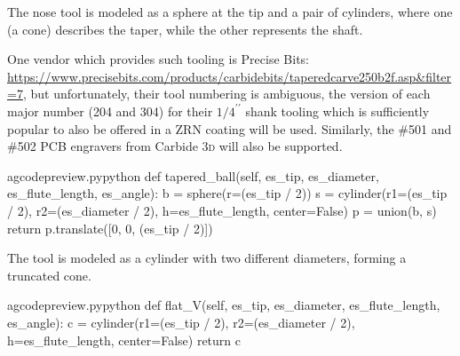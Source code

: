 \documentclass{ltxdoc}
\begin{document}
The  nose tool is modeled as a sphere at the tip and a pair of cylinders, where one (a cone) describes the taper, while the other represents the shaft.

One vendor which provides such tooling is Precise Bits: \url{https://www.precisebits.com/products/carbidebits/taperedcarve250b2f.asp&filter=7}, but unfortunately, their tool numbering is ambiguous, the version of each major number (204 and 304) for their $1/4^{\prime\prime}$ shank tooling which is sufficiently popular to also be offered in a ZRN coating will be used. Similarly, the \#501 and \#502 PCB engravers from Carbide \textsc{3d} will also be supported.

\lstset{firstnumber=\thegcpy}
\begin{writecode}{a}{gcodepreview.py}{python}
    def tapered_ball(self, es_tip, es_diameter, es_flute_length, es_angle):
        b = sphere(r=(es_tip / 2))
        s = cylinder(r1=(es_tip / 2), r2=(es_diameter / 2), h=es_flute_length, center=False)
        p = union(b, s)
        return p.translate([0, 0, (es_tip / 2)])

\end{writecode}
\addtocounter{gcpy}{6}

The  tool is modeled as a cylinder with two different diameters, forming a truncated cone.

\lstset{firstnumber=\thegcpy}
\begin{writecode}{a}{gcodepreview.py}{python}
    def flat_V(self, es_tip, es_diameter, es_flute_length, es_angle):
        c = cylinder(r1=(es_tip / 2), r2=(es_diameter / 2), h=es_flute_length, center=False)
        return c

\end{writecode}
\addtocounter{gcpy}{4}

%
%
%
\end{document}
